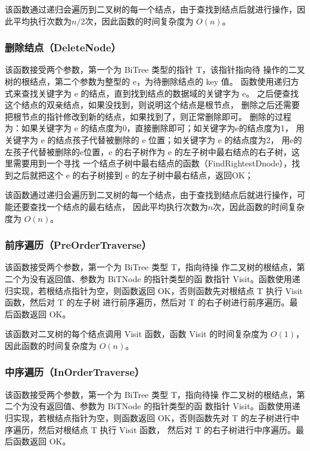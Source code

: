\documentclass[supercite]{Experimental_Report}
\theoremstyle{definition}
\begin{document}
该函数通过递归会遍历到二叉树的每一个结点，由于查找到结点后就进行操作，因此平均执行次数为$n/2$次，因此函数的时间复杂度为 $O(n)$。

\subsubsection{删除结点（DeleteNode）}

该函数接受两个参数，第一个为 BiTree 类型的指针 T，该指针指向待
操作的二叉树的根结点，第二个参数为整型的 e，为待删除结点的 key 值。
函数使用递归方式来查找关键字为 e 的结点，直到找到结点的数据域的关键字为 e。
之后便查找这个结点的双亲结点，如果没找到，则说明这个结点是根节点，
删除之后还需要把根节点的指针修改到新的结点，如果找到了，则正常删除即可。
删除的过程为：如果关键字为 e 的结点度为0，直接删除即可；如关键字为e的结点度为1，
用关键字为 e 的结点孩子代替被删除的 e 位置；如关键字为 e 的结点度为2，
用e的左孩子代替被删除的e位置，e 的右子树作为 e 的左子树中最右结点的右子树，这里需要用到一个寻找
一个结点子树中最右结点的函数（FindRightestDnode），找到之后就把这个 e 的右子树接到 e 的左子树中最右结点，返回OK；

该函数通过递归会遍历到二叉树的每一个结点，由于查找到结点后就进行操作，可能还要查找一个结点的最右结点，
因此平均执行次数为$n$次，因此函数的时间复杂度为 $O(n)$。


\subsubsection{前序遍历（PreOrderTraverse）}

该函数接受两个参数，第一个为 BiTree 类型 T，指向待操
作二叉树的根结点，第二个为没有返回值、参数为 BiTNode 的指针类型的函
数指针 Visit。函数使用递归实现，若根结点指针为空，则函数返回
OK，否则函数先对根结点 T 执行 Visit 函数，然后对 T 的左子树
进行前序遍历，然后对 T 的右子树进行前序遍历。最后函数返回 OK。

该函数对二叉树的每个结点调用 Visit 函数，函数 Visit 的时间复杂度为
$O(1)$，因此函数的时间复杂度为 $O(n)$。

\subsubsection{中序遍历（InOrderTraverse）}

该函数接受两个参数，第一个为 BiTree 类型 T，指向待操
作二叉树的根结点，第二个为没有返回值、参数为 BiTNode 的指针类型的函
数指针 Visit。函数使用递归实现，若根结点指针为空，则函数返回
OK，否则函数先对 T 的左子树进行中序遍历，然后对根结点 T 执行 Visit 函数，
然后对 T 的右子树进行中序遍历。最后函数返回 OK。
\end{document}

